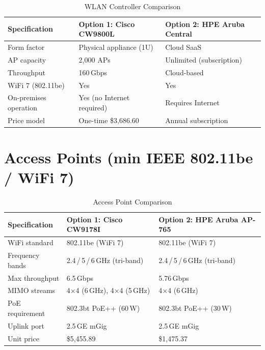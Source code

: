 \documentclass[12pt,a4paper]{report}
\begin{document}
\begin{table}[H]
  \centering
  \caption{WLAN Controller Comparison}
  \label{tab:wlan_ctrl_compare}
  \begin{tabular}{L{3.8cm} L{5.2cm} L{5.2cm}}
    \toprule
    \textbf{Specification} & \textbf{Option 1: Cisco CW9800L} & \textbf{Option 2: HPE Aruba Central} \\
    \midrule
    Form factor            & Physical appliance (1U)         & Cloud SaaS \\
    AP capacity            & 2{,}000 APs                     & Unlimited (subscription) \\
    Throughput             & 160\,Gbps                       & Cloud-based \\
    WiFi 7 (802.11be)      & Yes                             & Yes \\
    On-premises operation  & Yes (no Internet required)      & Requires Internet \\
    Price model            & One-time \$3{,}686.60           & Annual subscription \\
    \bottomrule
  \end{tabular}
\end{table}

\section{Access Points (min IEEE 802.11be / WiFi 7)}

\begin{table}[H]
  \centering
  \caption{Access Point Comparison}
  \label{tab:ap_compare}
  \begin{tabular}{L{3.8cm} L{5.2cm} L{5.2cm}}
    \toprule
    \textbf{Specification} & \textbf{Option 1: Cisco CW9178I} & \textbf{Option 2: HPE Aruba AP-765} \\
    \midrule
    WiFi standard          & 802.11be (WiFi 7)                & 802.11be (WiFi 7) \\
    Frequency bands        & 2.4\,/\,5\,/\,6\,GHz (tri-band) & 2.4\,/\,5\,/\,6\,GHz (tri-band) \\
    Max throughput         & 6.5\,Gbps                        & 5.76\,Gbps \\
    MIMO streams           & 4$\times$4 (6\,GHz), 4$\times$4 (5\,GHz) & 4$\times$4 (6\,GHz) \\
    PoE requirement        & 802.3bt PoE++ (60\,W)            & 802.3bt PoE++ (30\,W) \\
    Uplink port            & 2.5\,GE mGig                     & 2.5\,GE mGig \\
    Unit price       & \$5{,}455.89                     & \$1{,}475.37 \\
    \bottomrule
  \end{tabular}
\end{table}
\end{document}
